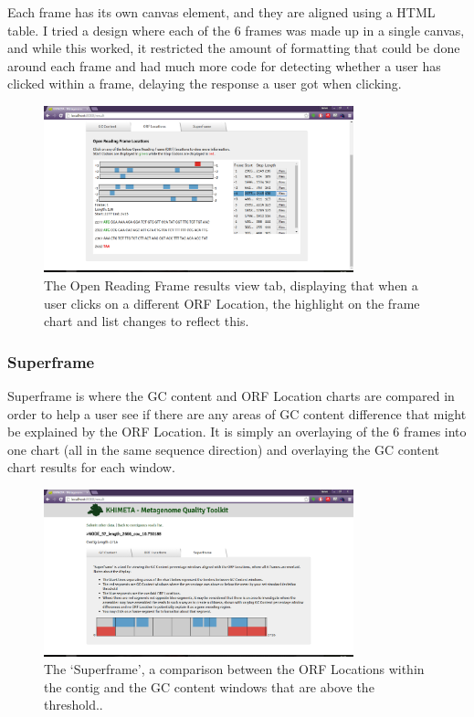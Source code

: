 Each frame has its own canvas element, and they are aligned using a HTML table. I tried a design where each of the 6 frames was made up in a single canvas, and while this worked, it restricted the amount of formatting that could be done around each frame and had much more code for detecting whether a user has clicked within a frame, delaying the response a user got when clicking.

\begin{figure}[H]
	\centering
\includegraphics[width=0.8\textwidth]{images/ui7}
\caption{The Open Reading Frame results view tab, displaying that when a user clicks on a different ORF Location, the highlight on the frame chart and list changes to reflect this.}
\end{figure}

\subsubsection{Superframe}
Superframe is where the GC content and ORF Location charts are compared in order to help a user see if there are any areas of GC content difference that might be explained by the ORF Location. It is simply an overlaying of the 6 frames into one chart (all in the same sequence direction) and overlaying the GC content chart results for each window.

\begin{figure}[H]
	\centering
\includegraphics[width=0.8\textwidth]{images/ui8}
\caption{The `Superframe', a comparison between the ORF Locations within the contig and the GC content windows that are above the threshold..}
\end{figure}

